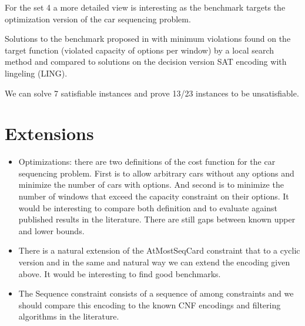 \documentclass[]{llncs}
\begin{document}
For the set 4 a more detailed view is interesting as the benchmark
targets the optimization version of the car sequencing problem. 

\DTLsetseparator{,}

\begin{table}[htbp]
    \caption{Solutions to the benchmark proposed in \cite{Gravel05} with
    minimum violations found on the target function (violated capacity
of options per window) by a local search method and compared to
solutions on the decision version  SAT encoding with lingeling (LING). }
    \centering
\end{table}


We can solve 7 satisfiable instances and prove 13/23 instances to be
unsatisfiable. 


\section{Extensions}

\begin{itemize}
    \item Optimizations: there are two definitions of the cost function
        for the car sequencing problem. First is to allow arbitrary cars
        without any options and minimize the number of cars with
        options. And second is to minimize the number of windows that
        exceed the capacity constraint on their options. It would be
        interesting to compare both definition and to evaluate against
        published results in the literature. There are still gaps
        between known upper and lower bounds. 
    \item There is a natural extension of the AtMostSeqCard constraint
        that to a cyclic version and in the same and natural way we can
        extend the encoding given above. It would be interesting to find
        good benchmarks. 
    \item The Sequence constraint consists of a sequence of among
        constraints and we should compare this encoding to the known CNF
        encodings and filtering algorithms in the literature. 
\end{itemize}




\end{document}
